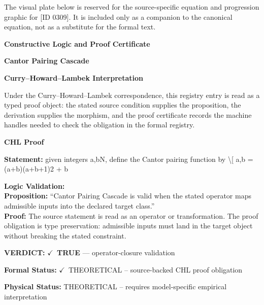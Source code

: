 \begingroup\footnotesize\sloppy
The visual plate below is reserved for the source-specific equation and progression graphic for [ID 0309]. It is included only as a companion to the canonical equation, not as a substitute for the formal text.
\par\endgroup
\ifTZPDarkEdition
{}
\fi

\clearpage
\begingroup\tzpsupportsetup
\noindent\textbf{\fontsize{10.8pt}{12.8pt}\selectfont [ID 0309] Constructive Logic and Proof Certificate}\par
\noindent\textbf{\fontsize{10pt}{12pt}\selectfont Cantor Pairing Cascade}\par
\vspace{0.45em}
\begingroup
\footnotesize
\setlength{\parskip}{0.22em}
\setlength{\parindent}{0pt}
\noindent\textbf{Curry--Howard--Lambek Interpretation}\par
Under the Curry--Howard--Lambek correspondence, this registry entry is read as a typed proof
object: the stated source condition supplies the proposition, the derivation supplies the
morphism, and the proof certificate records the machine handles needed to check the obligation
in the formal registry.

\vspace{0.45em}
\noindent\textbf{CHL Proof}\par
\textbf{Statement:} given integers a,bN, define the Cantor pairing function by \textbackslash{}[ a,b = (a+b)(a+b+1)2 + b

\textbf{Logic Validation:}\\
\textbf{Proposition:} ``Cantor Pairing Cascade is valid when the stated operator maps admissible inputs into the
declared target class.''\\
\textbf{Proof:} The source statement is read as an operator or transformation. The proof obligation is
type preservation: admissible inputs must land in the target object without breaking the
stated constraint.

\textbf{VERDICT:} \ensuremath{\checkmark}\ \textbf{TRUE} --- operator-closure validation

\textbf{Formal Status:} \ensuremath{\checkmark}\ THEORETICAL -- source-backed CHL proof obligation

\textbf{Physical Status:} THEORETICAL -- requires model-specific empirical interpretation
\par\vspace{0.45em}
\par
\ifTZPDarkEdition
{}
\fi
\endgroup
\endgroup
